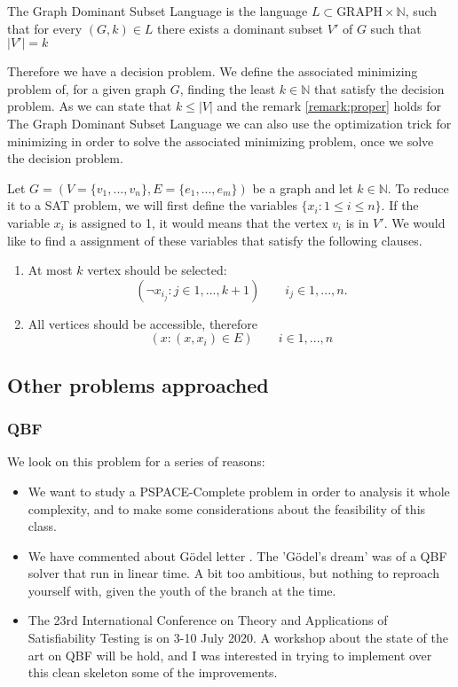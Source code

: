 \begin{definition}
  The Graph Dominant Subset Language is the language $L \subset \text{GRAPH} \times \mathbb{N}$, such that for every $( G, k ) \in L$ there exists a dominant subset $V'$  of $G$ such that $ |V'|= k$
\end{definition}

Therefore we have a decision problem. We define the associated minimizing problem of, for a given graph $G$, finding the least $k\in \mathbb{N}$ that satisfy the decision problem. As we can state that $k\le |V|$ and the remark \ref{remark:proper} holds for The Graph Dominant Subset Language  we can also use the optimization trick for minimizing in order to solve the associated minimizing problem, once we solve the decision problem. 

Let $G=(V=\{ v_1,...,v_n\},E= \{e_1,...,e_m\})$ be a graph and let $k\in \mathbb{N}$. To reduce it to a SAT problem, we will first define the variables $\{x_{i} : 1\le i \le n\}$. If the variable $x_{i}$ is assigned to 1, it would means that the vertex $v_i$ is in $V'$. We would like to find a assignment of these variables that satisfy the following clauses.
\begin{enumerate}
\item At most $k$ vertex should be selected:
  $$(\neg x_{i_j} : j\in 1,...,k +1 ) \qquad  i_j \in 1,...,n.$$
\item All vertices should be accessible, therefore
$$ ( x : (x,x_i)\in E ) \qquad i \in 1,...,n $$
\end{enumerate}

\subsection{Other problems approached}
\subsubsection{QBF}
We look on this problem for a series of reasons:
\begin{itemize}
\item We want to study a PSPACE-Complete problem in order to analysis it whole complexity, and to make some considerations about the feasibility of this class.
\item We have commented about Gödel letter \cite{hartmanis1993godel}. The 'Gödel's dream' was of a QBF solver that run in linear time. A bit too ambitious, but nothing to reproach yourself with, given the youth of the branch at the time.
\item The 23rd International Conference on Theory and Applications of Satisfiability Testing is on  3-10 July 2020. A workshop about the state of the art on QBF will be hold, and I was interested in trying to implement over this clean skeleton some of the improvements. \\
\end{itemize}

